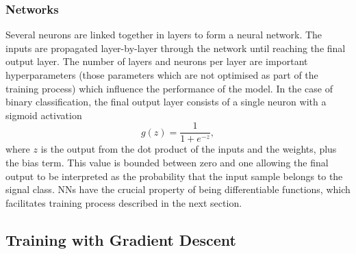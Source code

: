 \subsubsection{Networks}

Several neurons are linked together in layers to form a neural network.
The inputs are propagated layer-by-layer through the network until reaching the final output layer.
The number of layers and neurons per layer are important hyperparameters (those parameters which are not optimised as part of the training process) which influence the performance of the model.
In the case of binary classification, the final output layer consists of a single neuron with a sigmoid activation 
%
\begin{equation}\label{eq:sigmoid}
  g(z) = \frac{1}{1 + e^{-z}} ,
\end{equation}
%
where $z$ is the output from the dot product of the inputs and the weights, plus the bias term.
This value is bounded between zero and one allowing the final output to be interpreted as the probability that the input sample belongs to the signal class.
NNs have the crucial property of being differentiable functions, which facilitates training process described in the next section.





\subsection{Training with Gradient Descent}\label{sec:training_sgd}

